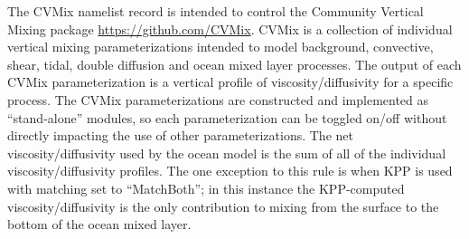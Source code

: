 The CVMix namelist record is intended to control the Community Vertical Mixing package \url{https://github.com/CVMix}. CVMix is a collection of individual vertical mixing parameterizations intended to model background, convective, shear, tidal, double diffusion and ocean mixed layer processes. The output of each CVMix parameterization is a vertical profile of viscosity/diffusivity for a specific process. The CVMix parameterizations are constructed and implemented as ``stand-alone'' modules, so each parameterization can be toggled on/off without directly impacting the use of other parameterizations. The net viscosity/diffusivity used by the ocean model is the sum of all of the individual viscosity/diffusivity profiles. The one exception to this rule is when KPP is used with matching set to ``MatchBoth''; in this instance the KPP-computed viscosity/diffusivity is the only contribution to mixing from the surface to the bottom of the ocean mixed layer.